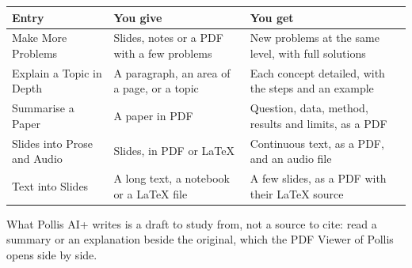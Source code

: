 \medskip
{\small
\begin{tabularx}{\linewidth}{@{}>{\raggedright\arraybackslash}p{42mm}>{\raggedright\arraybackslash}p{46mm}X@{}}
\toprule
\textbf{Entry} & \textbf{You give} & \textbf{You get} \\\midrule
Make More Problems & Slides, notes or a PDF with a few problems & New problems at the same level, with full solutions \\
Explain a Topic in Depth & A paragraph, an area of a page, or a topic & Each concept detailed, with the steps and an example \\
Summarise a Paper & A paper in PDF & Question, data, method, results and limits, as a PDF \\
Slides into Prose and Audio & Slides, in PDF or LaTeX & Continuous text, as a PDF, and an audio file \\
Text into Slides & A long text, a notebook or a LaTeX file & A few slides, as a PDF with their LaTeX source \\\bottomrule
\end{tabularx}}

\medskip
What Pollis AI+ writes is a draft to study from, not a source to cite: read a summary or an explanation beside
the original, which the PDF Viewer of Pollis opens side by side.

\nmcredit

